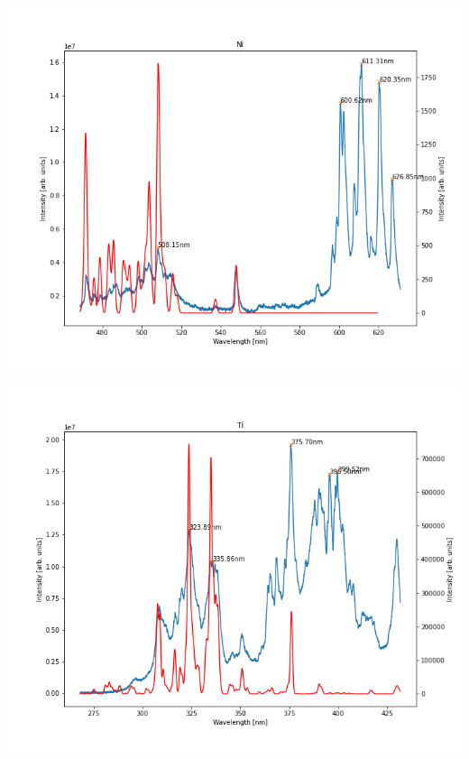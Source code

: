 \documentclass{beamer}
\begin{document}
\begin{frame}
    \includegraphics[scale=0.45]{Ni/550.png}
\end{frame}

\begin{frame}
    \includegraphics[scale=0.45]{Ti/350nm.png}
\end{frame}
\end{document}
